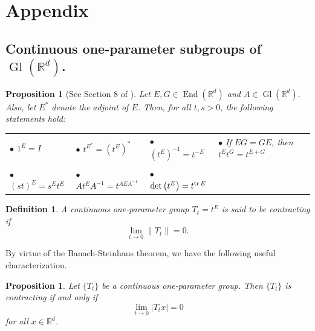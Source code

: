 \documentclass[11pt]{article}
\newtheorem{definition}[theorem]{Definition}
\newtheorem{proposition}[theorem]{Proposition}
\theoremstyle{remark}
\newcommand\End{\operatorname{End}} %
\newcommand\Gl{\operatorname{Gl}} %
\renewcommand\det{\operatorname{det}}
\begin{document}






\appendix



\section{Appendix}\label{sec:Appendix}
\subsection{Continuous one-parameter subgroups of $\Gl(\mathbb{R}^d)$.}\label{subsec:OneParameterGroups}

\begin{proposition}[See Section 8 of \cite{Randles2017}]\label{prop:ContinuousGroupProperties}
Let $E,G\in\End(\mathbb{R}^d)$ and $A\in\Gl(\mathbb{R}^d)$. Also, let $E^*$ denote the adjoint of $E$. Then, for all $t,s>0$, the following statements hold:

\vspace{.3cm}
\begin{tabular}{lllll}
$\bullet$ $1^E=I$ &  $\bullet$ $t^{E^*}=(t^E)^*$ & $\bullet$ $(t^E)^{-1}=t^{-E}$ &   $\bullet$ If $EG=GE$, then $t^Et^G=t^{E+G}$\\
\vspace{.1cm}\\
$\bullet$ $(st)^E=s^Et^E$ & $\bullet$ $At^EA^{-1}=t^{AEA^{-1}}$&  $\bullet$ $\det\left(t^E\right)=t^{\tr E}$\\

\end{tabular}
\end{proposition}

\begin{definition} A continuous one-parameter group $T_t=t^E$ is said to be \textit{contracting} if
\begin{equation*}
\lim_{t\to 0}\|T_t\|=0. 
\end{equation*}
\end{definition}
\noindent By virtue of the Banach-Steinhaus theorem, we have the following useful characterization.
\begin{proposition}\label{prop:ContractingCharacterization}
Let $\{T_t\}$ be a continuous one-parameter group. Then $\{T_t\}$ is contracting if and only if
\begin{equation}\label{eq:ContractingSufficient}
\lim_{t\to 0}|T_tx|=0
\end{equation}
for all $x\in\mathbb{R}^d$.
\end{proposition}
\end{document}
